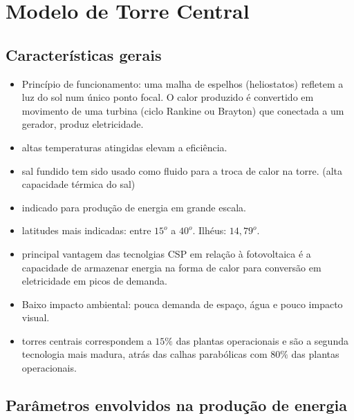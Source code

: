 \documentclass[12pt,notheorems,hyperref={pdfauthor=Professor Rafael Nardi}]{beamer}
\begin{document}
\section{Modelo de Torre Central}

\subsection{Características gerais}

\begin{frame}
	\begin{itemize}
		\item Princípio de funcionamento: uma malha de espelhos (heliostatos)
			refletem a luz do sol num único ponto focal. O calor produzido é
			convertido em movimento de uma turbina (ciclo Rankine ou Brayton) que
			conectada a um gerador, produz eletricidade.\pause
		\item altas temperaturas atingidas elevam a eficiência.\pause
		\item sal fundido tem sido usado como fluido para a troca de calor na
			torre. (alta capacidade térmica do sal) \pause
		\item indicado para produção de energia em grande escala.\pause
		\item latitudes mais indicadas: entre $15^o$ a $40^o$. Ilhéus: $14,79^o$.\pause
		\item principal vantagem das tecnolgias CSP em relação à fotovoltaica é a
			capacidade de armazenar energia na forma de calor para conversão em
			eletricidade em picos de demanda.\pause
		\item Baixo impacto ambiental: pouca demanda de espaço, água e pouco impacto visual.\pause
		\item torres centrais correspondem a $15\%$ das plantas operacionais e são
			a segunda tecnologia mais madura, atrás das calhas parabólicas com
			$80\%$ das plantas operacionais.
	\end{itemize}
\end{frame}

\subsection{Parâmetros envolvidos na produção de energia}
\end{document}
